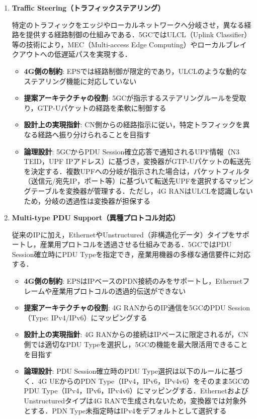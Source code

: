 \begin{enumerate}
\item \textbf{Traffic Steering（トラフィックステアリング）}

特定のトラフィックをエッジやローカルネットワークへ分岐させ，異なる経路を提供する経路制御の仕組みである．5GCではULCL（Uplink Classifier）等の技術により，MEC（Multi-access Edge Computing）やローカルブレイクアウトへの低遅延パスを実現する．

  \begin{itemize}
  \item \textbf{4G側の制約}: EPSでは経路制御が限定的であり，ULCLのような動的なステアリング機能に対応していない
  \item \textbf{提案アーキテクチャの役割}: 5GCが指示するステアリングルールを受取り，GTP-Uパケットの経路を柔軟に制御する
  \item \textbf{設計上の実現指針}: CN側からの経路指示に従い，特定トラフィックを異なる経路へ振り分けられることを目指す
  \item \textbf{論理設計}: 5GCからPDU Session確立応答で通知されるUPF情報（N3 TEID，UPF IPアドレス）に基づき，変換器がGTP-Uパケットの転送先を決定する．複数UPFへの分岐が指示された場合は，パケットフィルタ（送信元/宛先IP，ポート等）に基づいて転送先UPFを選択するマッピングテーブルを変換器が管理する．ただし，4G RANはULCLを認識しないため，分岐の透過性は変換器が担保する
  \end{itemize}

\item \textbf{Multi-type PDU Support（異種プロトコル対応）}

従来のIPに加え，EthernetやUnstructured（非構造化データ）タイプをサポートし，産業用プロトコルを透過させる仕組みである．5GCではPDU Session確立時にPDU Typeを指定でき，産業用機器の多様な通信要件に対応する．

  \begin{itemize}
  \item \textbf{4G側の制約}: EPSはIPベースのPDN接続のみをサポートし，Ethernetフレームや産業用プロトコルの透過的伝送ができない
  \item \textbf{提案アーキテクチャの役割}: 4G RANからのIP通信を5GCのPDU Session（Type: IPv4/IPv6）にマッピングする
  \item \textbf{設計上の実現指針}: 4G RANからの接続はIPベースに限定されるが，CN側では適切なPDU Typeを選択し，5GCの機能を最大限活用できることを目指す
  \item \textbf{論理設計}: PDU Session確立時のPDU Type選択は以下のルールに基づく．4G UEからのPDN Type（IPv4，IPv6，IPv4v6）をそのまま5GCのPDU Type（IPv4，IPv6，IPv4v6）にマッピングする．EthernetおよびUnstructuredタイプは4G RANで生成されないため，変換器では対象外とする．PDN Type未指定時はIPv4をデフォルトとして選択する
  \end{itemize}
\end{enumerate}

